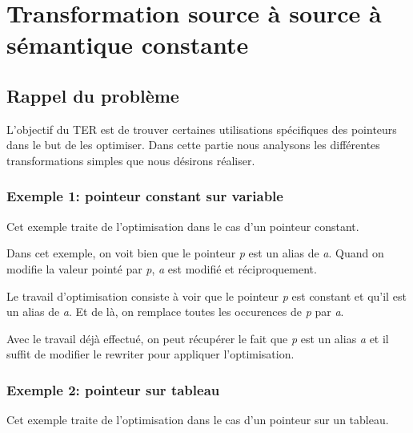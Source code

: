 \documentclass[11pt]{article}
\begin{document}


\section{Transformation source à source à sémantique constante}

  \subsection{Rappel du problème}

    L'objectif du TER est de trouver certaines utilisations
    spécifiques des pointeurs dans le but de les optimiser.  Dans
    cette partie nous analysons les différentes transformations
    simples que nous désirons réaliser.


    
    \subsubsection{Exemple 1: pointeur constant sur variable}
      Cet exemple traite de l'optimisation dans le cas d'un pointeur constant.
      
      
      
      Dans cet exemple, on voit bien que le pointeur \textit{p} est un alias de \textit{a}. 
      Quand on modifie la valeur pointé par \textit{p}, \textit{a} est modifié et réciproquement.
      
      Le travail d'optimisation consiste à voir que le pointeur \textit{p} est constant et qu'il est un alias de \textit{a}. 
      Et de là, on remplace toutes les occurences de \textit{p} par \textit{a}.
      
      Avec le travail déjà effectué, on peut récupérer le fait que \textit{p} est un alias \textit{a} et il suffit de modifier le rewriter pour appliquer l'optimisation.
      
      
    
    \subsubsection{Exemple 2: pointeur sur tableau}
      Cet exemple traite de l'optimisation dans le cas d'un pointeur sur un tableau.
      
      
\end{document}
